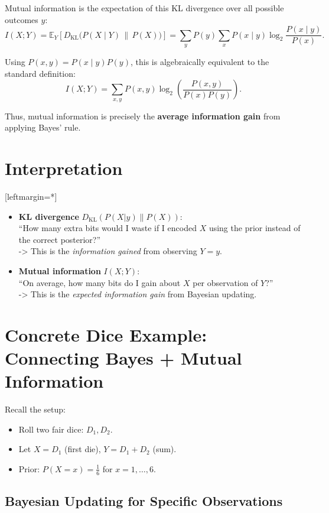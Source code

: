 \documentclass{article}
\begin{document}
Mutual information is the expectation of this KL divergence over all possible outcomes \(y\):
\[
\boxed{
I(X;Y) = \mathbb{E}_{Y}\!\left[ D_{\mathrm{KL}}\big(P(X \mid Y) \,\|\, P(X)\big) \right]
= \sum_{y} P(y) \sum_{x} P(x \mid y) \log_2 \frac{P(x \mid y)}{P(x)}.
}
\]

Using \(P(x,y) = P(x \mid y) P(y)\), this is algebraically equivalent to the standard definition:
\[
I(X;Y) = \sum_{x,y} P(x,y) \log_2 \left( \frac{P(x,y)}{P(x) P(y)} \right).
\]

Thus, mutual information is precisely the \textbf{average information gain} from applying Bayes' rule.

\section*{Interpretation}


[leftmargin=*]\begin{itemize}
    \item \textbf{KL divergence} \(D_{\mathrm{KL}}(P(X|y) \| P(X))\): \\
    ``How many extra bits would I waste if I encoded \(X\) using the prior instead of the correct posterior?'' \\
    -> This is the \emph{information gained} from observing \(Y = y\).

    \item \textbf{Mutual information} \(I(X;Y)\): \\
    ``On average, how many bits do I gain about \(X\) per observation of \(Y\)?'' \\
    -> This is the \emph{expected information gain} from Bayesian updating.
\end{itemize}

\section*{Concrete Dice Example: Connecting Bayes + Mutual Information}

Recall the setup:
\begin{itemize}
\item Roll two fair dice: \(D_1, D_2\).
    \item Let \(X = D_1\) (first die), \(Y = D_1 + D_2\) (sum).
    \item Prior: \(P(X = x) = \frac{1}{6}\) for \(x = 1,\dots,6\).
\end{itemize}

\subsection*{Bayesian Updating for Specific Observations}
\end{document}
